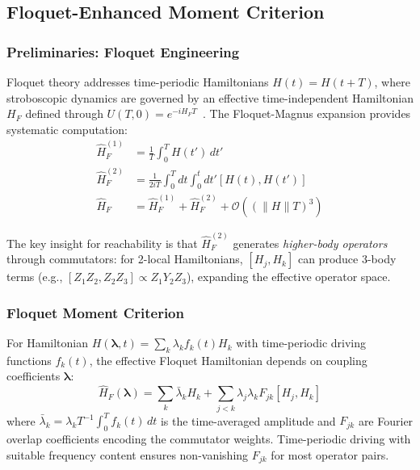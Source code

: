 
\subsection{Floquet-Enhanced Moment Criterion}
\label{sec:floquet_results}

\subsubsection{Preliminaries: Floquet Engineering}

Floquet theory addresses time-periodic Hamiltonians $H(t) = H(t+T)$, where stroboscopic dynamics are governed by an effective time-independent Hamiltonian $H_F$ defined through $U(T,0) = e^{-iH_F T}$~\cite{Goldman_2014}. The Floquet-Magnus expansion provides systematic computation:
\begin{align}
\hat{H}_F^{(1)} &= \frac{1}{T}\int_0^T H(t') \, dt' \label{eq:magnus_first} \\
\hat{H}_F^{(2)} &= \frac{1}{2iT}\int_0^T dt \int_0^t dt' [H(t), H(t')] \label{eq:magnus_second} \\
\hat{H}_F &= \hat{H}_F^{(1)} + \hat{H}_F^{(2)} + \mathcal{O}((\|H\|T)^3)
\end{align}

The key insight for reachability is that $\hat{H}_F^{(2)}$ generates \emph{higher-body operators} through commutators: for 2-local Hamiltonians, $[H_j, H_k]$ can produce 3-body terms (e.g., $[Z_1 Z_2, Z_2 Z_3] \propto Z_1 Y_2 Z_3$), expanding the effective operator space.

\subsubsection{Floquet Moment Criterion}

For Hamiltonian $H(\boldsymbol{\lambda}, t) = \sum_k \lambda_k f_k(t) H_k$ with time-periodic driving functions $f_k(t)$, the effective Floquet Hamiltonian depends on coupling coefficients $\boldsymbol{\lambda}$:
\begin{equation}
\hat{H}_F(\boldsymbol{\lambda}) = \sum_k \bar{\lambda}_k H_k + \sum_{j<k} \lambda_j \lambda_k F_{jk} [H_j, H_k]
\label{eq:floquet_hamiltonian}
\end{equation}
where $\bar{\lambda}_k = \lambda_k T^{-1}\int_0^T f_k(t)\,dt$ is the time-averaged amplitude and $F_{jk}$ are Fourier overlap coefficients encoding the commutator weights. Time-periodic driving with suitable frequency content ensures non-vanishing $F_{jk}$ for most operator pairs.

